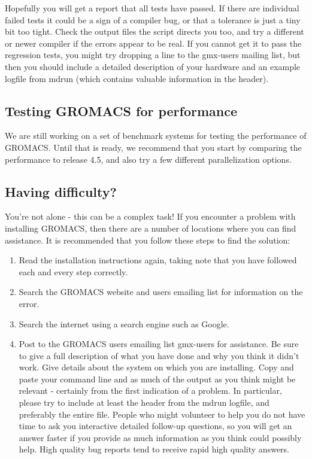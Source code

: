 \documentclass{article}[12pt,a4paper,twoside]
\newcommand{\gromacs}{GROMACS}
\begin{document}
Hopefully you will get a report that all tests have passed. If there
are individual failed tests it could be a sign of a compiler bug, or
that a tolerance is just a tiny bit too tight. Check the output files
the script directs you too, and try a different or newer compiler if
the errors appear to be real. If you cannot get it to pass the
regression tests, you might try dropping a line to the gmx-users
mailing list, but then you should include a detailed description of
your hardware and an example logfile from mdrun (which contains
valuable information in the header).

\subsection{Testing \gromacs{} for performance}
We are still working on a set of benchmark systems for testing
the performance of \gromacs{}. Until that is ready, we recommend that
you start by comparing the performance to release 4.5, and also try
a few different parallelization options.

\subsection{Having difficulty?}
You're not alone - this can be a complex task! If you encounter a
problem with installing \gromacs{}, then there are a number of
locations where you can find assistance. It is recommended that you
follow these steps to find the solution:

\begin{enumerate}
\item Read the installation instructions again, taking note that you
  have followed each and every step correctly.
\item Search the \gromacs{} website and users emailing list for
  information on the error.
\item Search the internet using a search engine such as Google.
\item Post to the \gromacs{} users emailing list gmx-users for
  assistance. Be sure to give a full description of what you have done
  and why you think it didn't work. Give details about the system on
  which you are installing. 
  Copy and paste your command line and as
  much of the output as you think might be relevant - certainly from
  the first indication of a problem. In particular, please try to include at
  least the header from the mdrun logfile, and preferably the entire file.
  People who might volunteer to
  help you do not have time to ask you interactive detailed follow-up
  questions, so you will get an answer faster if you provide as much
  information as you think could possibly help. High quality bug reports 
  tend to receive rapid high quality answers.
\end{enumerate}
\end{document}
